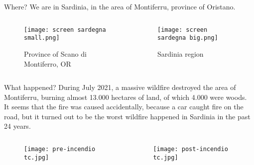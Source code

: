 \documentclass{beamer}
\begin{document}
\begin{frame}{Where?}
We are in Sardinia, in the area of Montiferru, province of Oristano.
\bigskip
\begin{columns}

    \begin{column}{0.5\textwidth}
    \begin{figure}
        \centering
        \texttt{[image: screen sardegna small.png]}
        \caption{Province of Scano di Montiferro, OR}
    \end{figure}
    \end{column}
    
    \begin{column}{0.5\textwidth}
    \begin{figure}
        \centering
        \texttt{[image: screen sardegna big.png]}
        \caption{Sardinia region}
    \end{figure}
    \end{column}
    
\end{columns}
\end{frame}

\begin{frame}{What happened?}
During July 2021, a massive wildfire destroyed the area of Montiferru, burning almost 13.000 hectares of land, of which 4.000 were woods.\\It seems that the fire was caused accidentally, because a car caught fire on the road, but it turned out to be the worst wildfire happened in Sardinia in the past 24 years. 

\begin{columns}
    \begin{column}{0.5\textwidth}
        \begin{figure}
            \centering
            \texttt{[image: pre-incendio tc.jpg]}
        \end{figure}
    \end{column}

    \begin{column}{0.5\textwidth}
    \begin{figure}
        \centering
        \texttt{[image: post-incendio tc.jpg]}
    \end{figure}
    \end{column}
\end{columns}
\end{frame}
\end{document}
